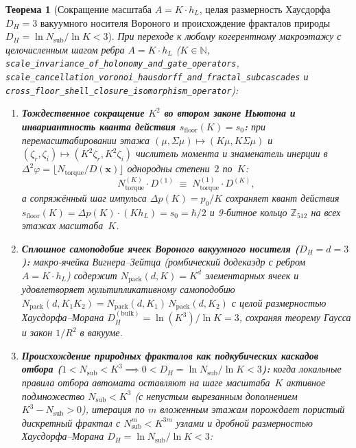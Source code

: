 \documentclass[11pt,a4paper]{article}
\theoremstyle{plain}
\newtheorem{theorem}{Теорема}[section]
\theoremstyle{definition}
\begin{document}
\begin{theorem}[Сокращение масштаба $A = K\cdot h_L$, целая размерность Хаусдорфа $D_H = 3$ вакуумного носителя Вороного и происхождение фракталов природы $D_H = \ln N_{\mathrm{sub}}/\ln K < 3$]
\label{thm:scale-cancellation-fractals}
При переходе к любому когерентному макроэтажу с целочисленным шагом ребра $A = K\cdot h_L$ ($K\in\mathbb{N}$, \texttt{scale\_invariance\_of\_holonomy\_and\_gate\_operators}, \texttt{scale\_cancellation\_voronoi\_hausdorff\_and\_fractal\_subcascades} и \texttt{cross\_floor\_shell\_closure\_isomorphism\_operator}):
\begin{enumerate}[label=\textbf{(\arabic*)},leftmargin=*]
\item \textbf{Тождественное сокращение $K^2$ во втором законе Ньютона и инвариантность кванта действия $s_{\mathrm{floor}}(K) = s_0$:}
  при перемасштабировании этажа $(\mu,\Sigma\mu)\mapsto(K\mu,K\Sigma\mu)$ и $(\zeta_r,\zeta_i)\mapsto(K^2\zeta_r,K^2\zeta_i)$ числитель момента и знаменатель инерции в $\Delta^2\varphi = \lfloor N_{\mathrm{torque}}/D(\mathbf{x})\rfloor$ однородны степени~$2$ по~$K$:
  \begin{equation}
    \label{eq:scale-k2-cancel}
    N_{\mathrm{torque}}^{(K)}\cdot D^{(1)} \;\equiv\; N_{\mathrm{torque}}^{(1)}\cdot D^{(K)},
  \end{equation}
  а сопряжённый шаг импульса $\Delta p(K) = p_0/K$ сохраняет квант действия $s_{\mathrm{floor}}(K) = \Delta p(K)\cdot(K h_L) = s_0 = \hbar/2$ и 9-битное кольцо $\mathbb{Z}_{512}$ на всех этажах масштаба~$K$.
\item \textbf{Сплошное самоподобие ячеек Вороного вакуумного носителя ($D_H = d = 3$):}
  макро-ячейка Вигнера--Зейтца (ромбический додекаэдр с ребром $A = K\cdot h_L$) содержит $N_{\mathrm{pack}}(d,K) = K^d$ элементарных ячеек и удовлетворяет мультипликативному самоподобию $N_{\mathrm{pack}}(d,K_1 K_2) = N_{\mathrm{pack}}(d,K_1)\,N_{\mathrm{pack}}(d,K_2)$ с целой размерностью Хаусдорфа--Морана $D_H^{(\mathrm{bulk})} = \ln(K^3)/\ln K = 3$, сохраняя теорему Гаусса и закон $1/R^2$ в вакууме.
\item \textbf{Происхождение природных фракталов как подкубических каскадов отбора ($1 < N_{\mathrm{sub}} < K^3 \implies 0 < D_H = \ln N_{\mathrm{sub}}/\ln K < 3$):}
  когда локальные правила отбора автомата оставляют на шаге масштаба~$K$ активное подмножество $N_{\mathrm{sub}} < K^3$ (с непустым вырезанным дополнением $K^3 - N_{\mathrm{sub}} > 0$), итерация по $m$ вложенным этажам порождает пористый дискретный фрактал с $N_{\mathrm{sub}}^m < K^{3m}$ узлами и дробной размерностью Хаусдорфа--Морана $D_H = \ln N_{\mathrm{sub}}/\ln K < 3$:

\end{enumerate}
\end{theorem}
\end{document}
